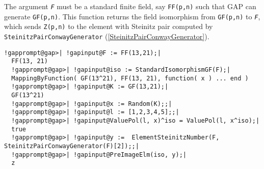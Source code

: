 \documentclass[a4paper,11pt]{report}
\begin{document}
{{{ The argument \mbox{\texttt{\mdseries\slshape F}} must be a standard finite field, say \texttt{FF(p,n)} such that \textsf{GAP} can generate \texttt{GF(p,n)}. This function returns the field isomorphism from \texttt{GF(p,n)} to \mbox{\texttt{\mdseries\slshape F}}, which sends \texttt{Z(p,n)} to the element with Steinitz pair computed by \texttt{SteinitzPairConwayGenerator} (\ref{SteinitzPairConwayGenerator}). 

 
\begin{Verbatim}[commandchars=!@|,fontsize=\small,frame=single,label=Example]
  !gapprompt@gap>| !gapinput@F := FF(13,21);|
  FF(13, 21)
  !gapprompt@gap>| !gapinput@iso := StandardIsomorphismGF(F);|
  MappingByFunction( GF(13^21), FF(13, 21), function( x ) ... end )
  !gapprompt@gap>| !gapinput@K := GF(13,21);|
  GF(13^21)
  !gapprompt@gap>| !gapinput@x := Random(K);;|
  !gapprompt@gap>| !gapinput@l := [1,2,3,4,5];;|
  !gapprompt@gap>| !gapinput@ValuePol(l, x)^iso = ValuePol(l, x^iso);|
  true
  !gapprompt@gap>| !gapinput@y :=  ElementSteinitzNumber(F, SteinitzPairConwayGenerator(F)[2]);;|
  !gapprompt@gap>| !gapinput@PreImageElm(iso, y);|
  z
\end{Verbatim}
 }

 }

 }

  
\end{document}
